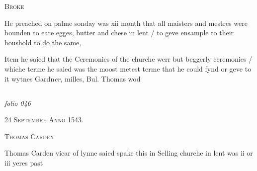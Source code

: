 \documentclass[12pt, a4paper]{book}
\begin{document}
               
                  
				\begin{center}  {\scshape Broke}  \end{center}
			
               	
				\marginpar[\vspace{0.5cm}{\textcolor{Gray}{lent}}]{}
			
		\ifthenelse{\isodd{\thepage}}
		{\reversemarginpar}
		{\normalmarginpar}
		He preached on palme sonday was xii month that
 all maisters and mestres were bounden to eate
 egges, butter and chese in lent / to geve ensample
 to their houshold to do the same,
               	
				\marginpar[\vspace{0.5cm}{\textcolor{Gray}{ceremonies}}]{}
			
               		
				\marginpar[\vspace{0.5cm}{\textcolor{Gray}{+}}]{}
			
               		
		\ifthenelse{\isodd{\thepage}}
		{\reversemarginpar}
		{\normalmarginpar}
		Item he saied that the Ceremonies of the churche
 werr but beggerly ceremonies / whiche terme
 he saied was the moost metest terme that he
 could fynd or geve to it wytnes Gardn\textit{er},
               			milles, Bul. Thomas wod


            
            
\dotfill
					  \subsection*{}

\textit{folio 046}


            
               
				\begin{center} \begin{large} {\scshape 
                  24 Septembre Anno 1543.} \end{large} \end{center}
			
               
                  
				\begin{center}  {\scshape Thomas Carden}  \end{center}
			
               	
		\ifthenelse{\isodd{\thepage}}
		{\reversemarginpar}
		{\normalmarginpar}
		Thomas Carden vicar of lynne saied spake this
 in Selling churche in lent was ii or iii yeres past
 
\end{document}
